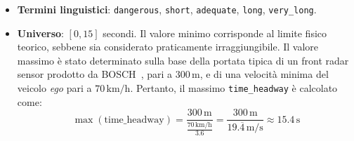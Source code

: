 \begin{itemize}
  \item \textbf{Termini linguistici}: \texttt{dangerous}, \texttt{short}, \texttt{adequate}, \texttt{long}, \texttt{very\_long}.
  \item \textbf{Universo}: \([0,15]\) secondi.  
        Il valore minimo corrisponde al limite fisico teorico, sebbene sia considerato praticamente irraggiungibile.
        Il valore massimo è stato determinato sulla base della portata tipica di un front radar sensor prodotto da BOSCH~\cite{bosch_radar}, pari a \(300\,\mathrm{m}\), e di una velocità minima del veicolo \emph{ego} pari a \(70\,\mathrm{km/h}\).  
        Pertanto, il massimo \texttt{time\_headway} è calcolato come:
        \[
            \max(\text{time\_headway}) =
            \frac{300 \,\mathrm{m}}{\frac{70\,\mathrm{km/h}}{3.6}} = 
            \frac{300 \,\mathrm{m}}{19.\overline{4}\,\mathrm{m/s}}
            \approx 15.4\,\mathrm{s}
        \]
\end{itemize}

